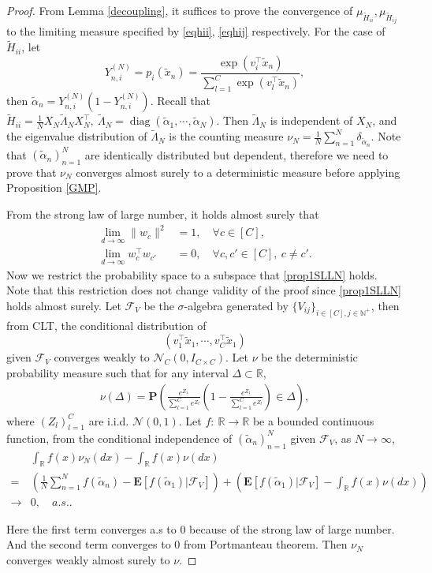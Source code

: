 \documentclass{article}
\newcommand{\diag}{\operatorname{diag}}
\newcommand{\R}{\mathbb{R}}
\newcommand{\N}{\mathbb{N}}
\newcommand{\E}{\mathbf{E}}
\newcommand{\mb}{\mathbb}
\newcommand\mf{\mathbf}
\newcommand\ml{\mathcal}
\newcommand{\wt}{\widetilde}
\newcommand{\rw}{\rightarrow}
\newcommand{\1}{^{(1)}}
\newcommand{\2}{^{(2)}}
\renewcommand{\l}{\left}
\renewcommand{\r}{\right}
\newcommand{\bea}{\begin{equation}\begin{aligned}}
\newcommand{\eea}{\end{aligned}\end{equation}}
\begin{document}
\begin{proof}
    From Lemma \ref{decoupling}, it suffices to prove the convergence of  $\mu_{\wt{H}_{ii}},\mu_{\wt{H}_{ij}}$ to the limiting measure specified by \eqref{eqhii}, \eqref{eqhij} respectively. For the case of $\wt{H}_{ii}$, let 
$$
Y_{n,i}^{(N)}=p_i(\wt{x}_n)=\frac{\exp(v_{i}^\top \wt{x}_n)}{\sum_{l=1}^C\exp(v_l^\top \wt{x}_n)},
$$
then $\wt{\alpha}_n=Y_{n,i}^{(N)}(1-Y_{n,i}^{(N)})$. Recall that $\wt{H}_{ii}=\frac{1}{N}X_N\wt{\Lambda}_NX_N^\top,\ \wt{\Lambda}_N=\diag(\wt{\alpha}_1,\cdots,\wt{\alpha}_N)$. Then $\wt{\Lambda}_N$ is independent of $X_N$, and the eigenvalue distribution of $\wt{\Lambda}_N$ is the counting measure
$\nu_N=\frac{1}{N}\sum_{n=1}^N\delta_{\wt{\alpha}_n}$. Note that $(\wt{\alpha}_n)_{n =1}^N$ are identically distributed but dependent, therefore we need to prove that $\nu_N$ converges almost surely to a deterministic measure before applying Proposition \ref{GMP}.




From the strong law of large number, it holds almost surely that
\bea\label{prop1SLLN}
\lim_{d\rw\infty}\|w_c\|^2&=1,\quad\forall c\in[C],\\
\lim_{d\rw\infty}w_c^\top w_{c'}&=0,\quad\forall c,c'\in[C],\ c\ne c'.
\eea
Now we restrict the probability space to a subspace that \eqref{prop1SLLN} holds. Note that this restriction does not change validity of the proof since \eqref{prop1SLLN} holds almost surely. Let $\mathcal{F}_V$ be the $\sigma$-algebra generated by $\{V_{ij}\}_{i\in [C],j\in\N^+}$, then from CLT, the conditional distribution of 
$$
(v_1^\top \wt{x}_1,\cdots,v_C^\top\wt{x}_1)
$$
given $\mathcal{F}_V$ converges weakly to $\mathcal{N}_C(0,I_{C\times C})$.
Let $\nu$ be the deterministic probability measure such that for any interval $\Delta\subset\mb{R}$,
\bea\label{nudel}
\nu(\Delta)=\mf{P}\l(\frac{e^{Z_1}}{\sum_{l=1}^C e^{Z_l}}\l(1-\frac{e^{Z_1}}{\sum_{l=1}^C e^{Z_l}}\r)\in \Delta\r),
\eea
where $(Z_l)_{l=1}^C$ are i.i.d. $\ml{N}(0,1)$.
Let $f:\ \R\rw\R$ be a bounded continuous function, from the conditional independence of $(\wt{\alpha}_n)_{n=1}^N$ given $\ml{F}_V$, as $N\rw\infty$,
\bea
&\int_{\R}f(x)\nu_N(dx)-\int_\R f(x)\nu(dx)\\
=&\l(\frac{1}{N}\sum_{n=1}^N f(\wt{\alpha}_n)-\E\l[f(\wt{\alpha}_1)|\ml{F}_V\r]\r)+\l(\E\l[f(\wt{\alpha}_1)|\ml{F}_V\r]-\int_\R f(x)\nu(dx)\r)\\
\rw&0,\quad a.s..
\eea


Here the first term converges a.s to $0$ because of the strong law of large number. And the second term converges to $0$ from Portmanteau theorem. Then $\nu_N$ converges weakly almost surely to $\nu$.


\end{proof}
\end{document}
